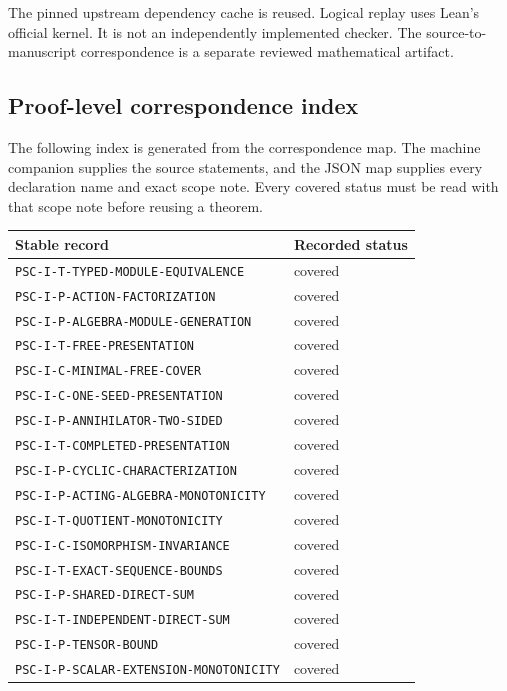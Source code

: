 The pinned upstream dependency cache is reused. Logical replay uses Lean's official kernel. It is not an independently implemented checker. The source-to-manuscript correspondence is a separate reviewed mathematical artifact.


\subsection{Proof-level correspondence index}
The following index is generated from the correspondence map. The machine companion supplies the source statements, and the JSON map supplies every declaration name and exact scope note. Every covered status must be read with that scope note before reusing a theorem.

{\small
\begin{longtable}{p{}p{}}
\toprule Stable record & Recorded status \\\midrule\endhead
\nolinkurl{PSC-I-T-TYPED-MODULE-EQUIVALENCE} & covered \\
\nolinkurl{PSC-I-P-ACTION-FACTORIZATION} & covered \\
\nolinkurl{PSC-I-P-ALGEBRA-MODULE-GENERATION} & covered \\
\nolinkurl{PSC-I-T-FREE-PRESENTATION} & covered \\
\nolinkurl{PSC-I-C-MINIMAL-FREE-COVER} & covered \\
\nolinkurl{PSC-I-C-ONE-SEED-PRESENTATION} & covered \\
\nolinkurl{PSC-I-P-ANNIHILATOR-TWO-SIDED} & covered \\
\nolinkurl{PSC-I-T-COMPLETED-PRESENTATION} & covered \\
\nolinkurl{PSC-I-P-CYCLIC-CHARACTERIZATION} & covered \\
\nolinkurl{PSC-I-P-ACTING-ALGEBRA-MONOTONICITY} & covered \\
\nolinkurl{PSC-I-T-QUOTIENT-MONOTONICITY} & covered \\
\nolinkurl{PSC-I-C-ISOMORPHISM-INVARIANCE} & covered \\
\nolinkurl{PSC-I-T-EXACT-SEQUENCE-BOUNDS} & covered \\
\nolinkurl{PSC-I-P-SHARED-DIRECT-SUM} & covered \\
\nolinkurl{PSC-I-T-INDEPENDENT-DIRECT-SUM} & covered \\
\nolinkurl{PSC-I-P-TENSOR-BOUND} & covered \\
\nolinkurl{PSC-I-P-SCALAR-EXTENSION-MONOTONICITY} & covered \\

\end{longtable}}
